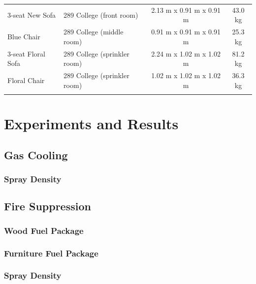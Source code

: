 \documentclass[12pt,oneside]{book}
\begin{document}
\begin{table}
\begin{tabular}{llcc}
				3-seat New Sofa              &  289 College (front room)         &  2.13 m x 0.91 m x 0.91 m  &  43.0 kg    \\
				Blue Chair                   &  289 College (middle room)        &  0.91 m x 0.91 m x 0.91 m  &  25.3 kg    \\
				3-seat Floral Sofa           &  289 College (sprinkler room)     &  2.24 m x 1.02 m x 1.02 m  &  81.2 kg    \\
				Floral Chair                 &  289 College (sprinkler room)     &  1.02 m x 1.02 m x 1.02 m  &  36.3 kg    \\
				\noalign{\smallskip}\hline
			\end{tabular}
			\label{tab:Fuel_Masses}
		\end{table}
	
	\chapter{Experiments and Results}
	\label{chap:Experiments_and_Results}
	
	\section{Gas Cooling}
	\label{sec:Gas_Cooling}
	
	\subsection{Spray Density}
	\label{subsec:Spray_Density}
	
	\section{Fire Suppression}
	\label{sec:Fire_Suppression}	
		
	\subsection{Wood Fuel Package}
	\label{subsec:Wood_Fuel_Package}
	
	\subsection{Furniture Fuel Package}
	\label{subsec:Furniture_Fuel_Package}
	
	\subsection{Spray Density}
	\label{subsec:Spray_Density}
		
\end{document}
